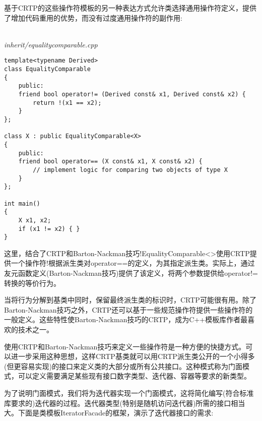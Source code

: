 基于CRTP的这些操作符模板的另一种表达方式允许类选择通用操作符定义，提供了增加代码重用的优势，而没有过度通用操作符的副作用:

\hspace*{\fill} \\ %
\noindent
\textit{inherit/equalitycomparable.cpp}
\begin{lstlisting}[style=styleCXX]
template<typename Derived>
class EqualityComparable
{
	public:
	friend bool operator!= (Derived const& x1, Derived const& x2) {
		return !(x1 == x2);
	}
};

class X : public EqualityComparable<X>
{
	public:
	friend bool operator== (X const& x1, X const& x2) {
		// implement logic for comparing two objects of type X
	}
};

int main()
{
	X x1, x2;
	if (x1 != x2) { }
}
\end{lstlisting}

这里，结合了CRTP和Barton-Nackman技巧!EqualityComparable<>使用CRTP提供一个操作符!根据派生类对operator==的定义，为其指定派生类。实际上，通过友元函数定义(Barton-Nackman技巧)提供了该定义，将两个参数提供给operator!=转换的等价行为。

当将行为分解到基类中同时，保留最终派生类的标识时，CRTP可能很有用。除了Barton-Nackman技巧之外，CRTP还可以基于一些规范操作符提供一些操作符的一般定义。这些特性使Barton-Nackman技巧的CRTP，成为C++模板库作者最喜欢的技术之一。


使用CRTP和Barton-Nackman技巧来定义一些操作符是一种方便的快捷方式。可以进一步采用这种思想，这样CRTP基类就可以用CRTP派生类公开的一个小得多(但更容易实现)的接口来定义类的大部分或所有公共接口。这种模式称为门面模式，可以定义需要满足某些现有接口数字类型、迭代器、容器等要求的新类型。

为了说明门面模式，我们将为迭代器实现一个门面模式，这将简化编写(符合标准库要求的)迭代器的过程。迭代器类型(特别是随机访问迭代器)所需的接口相当大。下面是类模板IteratorFacade的框架，演示了迭代器接口的需求:

